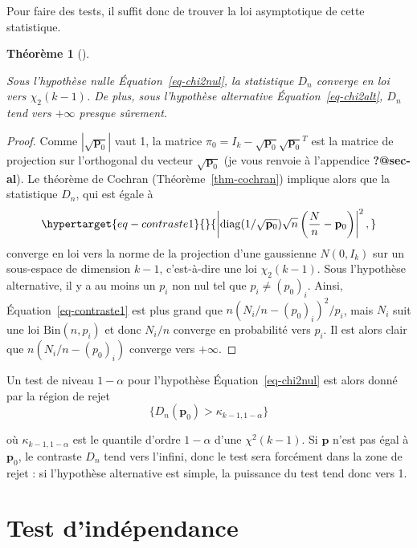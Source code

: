 \documentclass[
  10,
  letterpaper,
  DIV=11,
  numbers=noendperiod]{scrreport}
\theoremstyle{plain}
\newtheorem{theorem}{Théorème}[chapter]
\theoremstyle{definition}
\theoremstyle{plain}
\theoremstyle{definition}
\theoremstyle{definition}
\theoremstyle{plain}
\theoremstyle{remark}
\begin{document}
Pour faire des tests, il suffit donc de trouver la loi asymptotique de
cette statistique.

\begin{theorem}[]\protect\hypertarget{thm-loicontraste}{}\label{thm-loicontraste}

Sous l'hypothèse nulle Équation~\ref{eq-chi2nul}, la statistique \(D_n\)
converge en loi vers \(\chi_2(k-1)\). De plus, sous l'hypothèse
alternative Équation~\ref{eq-chi2alt}, \(D_n\) tend vers \(+\infty\)
presque sûrement.

\end{theorem}

\begin{proof}

Comme \(|\sqrt{\mathbf{p}_0}|\) vaut 1, la matrice
\(\pi_0=I_k -\sqrt{\mathbf{p}_0} \sqrt{\mathbf{p}_0}^T\) est la matrice
de projection sur l'orthogonal du vecteur \(\sqrt{\mathbf{p}_0}\) (je
vous renvoie à l'appendice \textbf{?@sec-al}). Le théorème de Cochran
(Théorème~\ref{thm-cochran}) implique alors que la statistique \(D_n\),
qui est égale à \begin{equation}\protect\hypertarget{eq-contraste1}{}{
\left| \mathrm{diag}(1/\sqrt{\mathbf{p}_0}) \sqrt{n}\left(\frac{N}{n}- \mathbf{p}_0\right) \right |^2, }\label{eq-contraste1}\end{equation}
converge en loi vers la norme de la projection d'une gaussienne
\(N(0,I_k)\) sur un sous-espace de dimension \(k-1\), c'est-à-dire une
loi \(\chi_2(k-1)\). Sous l'hypothèse alternative, il y a au moins un
\(p_i\) non nul tel que \(p_i \neq (p_0)_i\). Ainsi,
Équation~\ref{eq-contraste1} est plus grand que
\(n(N_i/n - (p_0)_i)^2 / p_i\), mais \(N_i\) suit une loi
\(\mathrm{Bin}(n,p_i)\) et donc \(N_i / n\) converge en probabilité vers
\(p_i\). Il est alors clair que \(n(N_i/n - (p_0)_i)\) converge vers
\(+\infty\).

\end{proof}

Un test de niveau \(1-\alpha\) pour l'hypothèse
Équation~\ref{eq-chi2nul} est alors donné par la région de rejet
\[ \{ D_n(\mathbf{p}_0) > \kappa_{k-1, 1-\alpha} \}\]

où \(\kappa_{k-1, 1-\alpha}\) est le quantile d'ordre \(1-\alpha\) d'une
\(\chi^2(k-1)\). Si \(\mathbf{p}\) n'est pas égal à \(\mathbf{p}_0\), le
contraste \(D_n\) tend vers l'infini, donc le test sera forcément dans
la zone de rejet : si l'hypothèse alternative est simple, la puissance
du test tend donc vers 1.

\hypertarget{test-dinduxe9pendance}{%
\section{Test d'indépendance}\label{test-dinduxe9pendance}}
\end{document}

